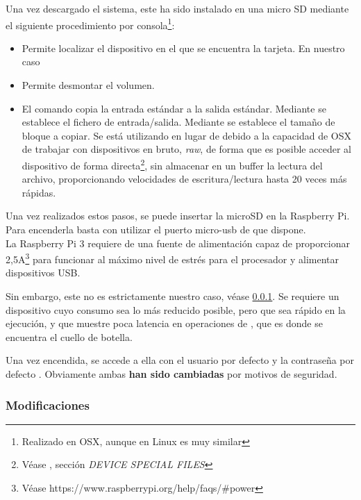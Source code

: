 Una vez descargado el sistema, este ha sido instalado en una micro SD mediante el siguiente procedimiento por consola\footnote{Realizado en OSX, aunque en Linux es muy similar}:
\begin{itemize}
\item{} Permite localizar el dispositivo en el que se encuentra la tarjeta. En nuestro caso 
\item{} Permite desmontar el volumen. 
\item{} El comando  copia la entrada estándar a la salida estándar. Mediante  se establece el fichero de entrada/salida. Mediante  se establece el tamaño de bloque a copiar. Se está utilizando  en lugar de  debido a la capacidad de OSX de trabajar con dispositivos en bruto, \textit{raw}, de forma que es posible acceder al dispositivo de forma directa\footnote{Véase , sección \textit{DEVICE SPECIAL FILES}}, sin almacenar en un buffer la lectura del archivo, proporcionando velocidades de escritura/lectura hasta 20 veces más rápidas.
\end{itemize}


Una vez realizados estos pasos, se puede insertar la microSD en la Raspberry Pi. Para encenderla basta con utilizar el puerto micro-usb de que dispone.\\La Raspberry Pi 3 requiere de una fuente de alimentación capaz de proporcionar 2,5A\footnote{Véase https://www.raspberrypi.org/help/faqs/\#power} para funcionar al máximo nivel de estrés para el procesador y alimentar dispositivos USB.

Sin embargo, este no es estrictamente nuestro caso, véase \ref{subsubsec:Modificaciones}. Se requiere un dispositivo cuyo consumo sea lo más reducido posible, pero que sea rápido en la ejecución, y que muestre poca latencia en operaciones de , que es donde se encuentra el cuello de botella.

Una vez encendida, se accede a ella con el usuario por defecto  y la contraseña por defecto . Obviamente ambas \textbf{han sido cambiadas} por motivos de seguridad.



\subsubsection{Modificaciones}
\label{subsubsec:Modificaciones}

